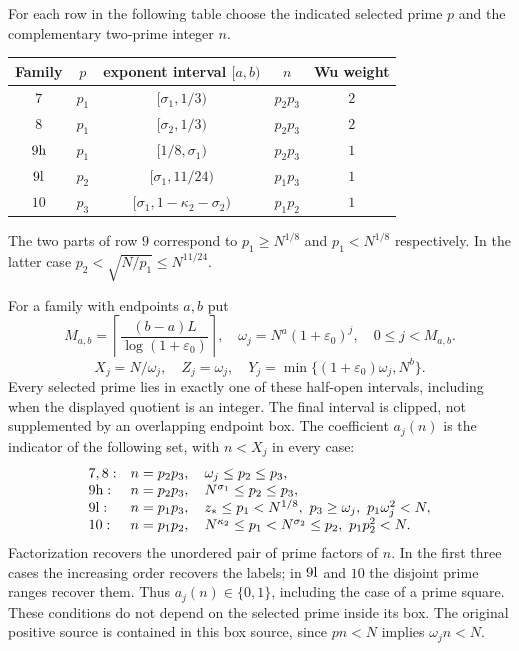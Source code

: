 \documentclass[11pt]{article}
\theoremstyle{definition}
\newcommand{\eps}{\varepsilon}
\begin{document}
For each row in the following table choose the indicated selected prime
$p$ and the complementary two-prime integer $n$.
\begin{center}
\begin{tabular}{@{}ccccc@{}}
\toprule
Family & $p$ & exponent interval $[a,b)$ & $n$ & Wu weight\\
\midrule
$7$ & $p_1$ & $[\sigma_1,1/3)$ & $p_2p_3$ & $2$\\
$8$ & $p_1$ & $[\sigma_2,1/3)$ & $p_2p_3$ & $2$\\
$9{\rm h}$ & $p_1$ & $[1/8,\sigma_1)$ & $p_2p_3$ & $1$\\
$9{\rm l}$ & $p_2$ & $[\sigma_1,11/24)$ & $p_1p_3$ & $1$\\
$10$ & $p_3$ & $[\sigma_1,1-\kappa_2-\sigma_2)$ & $p_1p_2$ & $1$\\
\bottomrule
\end{tabular}
\end{center}
The two parts of row $9$ correspond to $p_1\ge N^{1/8}$ and
$p_1<N^{1/8}$ respectively.  In the latter case
$p_2<\sqrt{N/p_1}\le N^{11/24}$.

For a family with endpoints $a,b$ put
\[
 M_{a,b}=\left\lceil\frac{(b-a)L}{\log(1+\eps_0)}\right\rceil,
 \quad \omega_j=N^a(1+\eps_0)^j,\quad 0\le j<M_{a,b}.
\]
\[
 X_j=N/\omega_j,\quad Z_j=\omega_j,\quad
 Y_j=\min\{(1+\eps_0)\omega_j,N^b\}.
\]
Every selected prime lies in exactly one of these half-open intervals,
including when the displayed quotient is an integer.  The final interval
is clipped, not supplemented by an overlapping endpoint box.
The coefficient $a_j(n)$ is the indicator of the following set, with
$n<X_j$ in every case:
\[
\begin{array}{ll}
7,8: & n=p_2p_3,\quad \omega_j\le p_2\le p_3,\\
9{\rm h}: & n=p_2p_3,\quad N^{\sigma_1}\le p_2\le p_3,\\
9{\rm l}: & n=p_1p_3,\quad z_*\le p_1<N^{1/8},\
                         p_3\ge\omega_j,\ p_1\omega_j^2<N,\\
10: & n=p_1p_2,\quad
 N^{\kappa_2}\le p_1<N^{\sigma_2}\le p_2,\ p_1p_2^2<N.
\end{array}
\]
Factorization recovers the unordered pair of prime factors of $n$.
In the first three cases the increasing order recovers the labels; in
$9{\rm l}$ and $10$ the disjoint prime ranges recover them.
Thus $a_j(n)\in\{0,1\}$, including the case of a prime square.  These
conditions do not depend on the selected prime inside its box.
The original positive source is contained in this box source, since
$pn<N$ implies $\omega_j n<N$.
\end{document}
